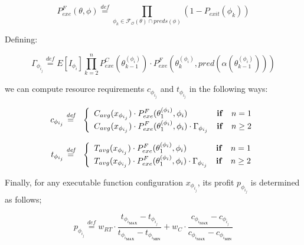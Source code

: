 \documentclass[12pt,a4paper]{report}
\newcommand{\mathDef}{\overset{\textit{def}}{=}}
\theoremstyle{definition}
\begin{document}
\begin{equation}
	P_{exe}^{F}(\theta, \phi) \mathDef \prod_{\phi_k \in \mathscr{F_O}(\theta) \cap preds(\phi)} (1 - P_{exit}(\phi_k))
\end{equation}

Defining:

\begin{equation}
	\Gamma_{\phi_{i_{j}}} \mathDef E[I_{\phi_i}] \prod_{k = 2}^{n}  P_{exe}^C(\theta^{(\phi_i)}_{k-1}) \cdot P_{exe}^{F}(\theta^{(\phi_i)}_{k}, pred(\alpha(\theta^{(\phi_i)}_{k-1})))
\end{equation}

we can compute resource requirements $c_{\phi_{i_{j}}}$ and $t_{\phi_{i_{j}}}$ in the following ways:


\begin{eqnarray}
	c_{\phi_{i_{j}}} & \mathDef & \left\{ 
	\begin{array}{lcl}
		C_{avg}(x_{\phi_{i_{j}}}) \cdot P_{exe}^{F}(\theta^{(\phi_i)}_1, \phi_i) & \text{\textbf{if}} & n = 1 \\ 
		\displaystyle C_{avg}(x_{\phi_{i_{j}}}) \cdot P_{exe}^{F}(\theta^{(\phi_i)}_1, \phi_i) \cdot \Gamma_{\phi_{i_{j}}} & \text{\textbf{if}} & n \geq 2 \\ 
	\end{array} \right.
\end{eqnarray}

\begin{eqnarray}
	t_{\phi_{i_{j}}} & \mathDef & \left\{ 
	\begin{array}{lcl}
		T_{avg}(x_{\phi_{i_{j}}}) \cdot P_{exe}^{F}(\theta^{(\phi_i)}_1, \phi_i) & \text{\textbf{if}} & n = 1 \\ 
		\displaystyle T_{avg}(x_{\phi_{i_{j}}}) \cdot P_{exe}^{F}(\theta^{(\phi_i)}_1, \phi_i) \cdot \Gamma_{\phi_{i_{j}}} & \text{\textbf{if}} & n \geq 2 \\ 
	\end{array} \right.
\end{eqnarray}





Finally, for any executable function configuration $x_{\phi_{i_j}}$, its profit $p_{\phi_{i_{j}}}$ is determined as follows;

\begin{equation}
	p_{\phi_{i_{j}}} \mathDef w_{RT} \cdot \dfrac{t_{\phi_{i_{\textbf{MAX}}}} - t_{\phi_{i_{j}}}}{t_{\phi_{i_{\textbf{MAX}}}} - t_{\phi_{i_{\textbf{MIN}}}}} + w_{C} \cdot \dfrac{c_{\phi_{i_{\textbf{MAX}}}} - c_{\phi_{i_{j}}}}{c_{\phi_{i_{\textbf{MAX}}}} - c_{\phi_{i_{\textbf{MIN}}}}}
\end{equation}
\end{document}
